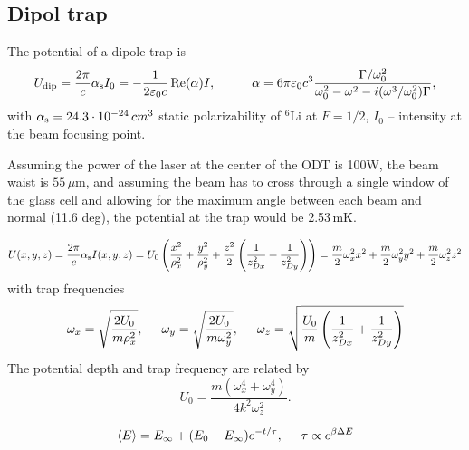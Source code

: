\subsection*{Dipol trap} 

The potential of a dipole trap is
\begin{equation}
	\sub{U}{dip} = \frac{2\pi}{c} \sub{\alpha}{s} I_0 = -\frac{1}{2 \varepsilon_0 c} \Re(\alpha) I,
	\hspace{10 mm} 
	\alpha = 6 \pi \varepsilon_0 c^3 \frac{\Gamma/\omega_0^2}{\omega_0^2 - \omega^2 - i (\omega^3 / \omega_0^2) \Gamma},
\end{equation}
with $\alpha_{\textnormal{s}} = 24.3 \cdot 10^{-24}\,cm^{3}$ static polarizability of $^{6}$Li at $F = 1/2$, $I_0$ -- intensity at the beam focusing point.


Assuming the power of the laser at the center of the ODT is 100W, the beam waist is $55\, \mu$m, and assuming the beam has to cross through a single window of the glass cell and allowing for the maximum angle between each beam and normal (11.6 deg), the potential at the trap would be 2.53\,mK.


\begin{equation*}
	U(x,y,z) = \frac{2\pi}{c} \alpha_{\textnormal{s}} I(x, y,z) = U_0 \left(
		\frac{x^2}{\rho_x^2} + \frac{y^2}{\rho_y^2} + \frac{z^2}{2} \left(\frac{1}{z_{Dx}^2} + \frac{1}{z_{Dy}^2}\right)
	\right) = \frac{m}{2}\omega_x^2 x^2 + \frac{m}{2} \omega_y^2 y^2 + \frac{m}{2} \omega_z^2 z^2
\end{equation*}
with trap frequencies
\begin{equation*}
	\omega_x = \sqrt{\frac{2U_0}{m \rho_x^2}},
	\hspace{5 mm} 
	\omega_y = \sqrt{\frac{2 U_0}{m \omega_y^2}},
	\hspace{5 mm} 
	\omega_z = \sqrt{\frac{U_0}{m}\left(
		\frac{1}{z_{Dx}^2} + \frac{1}{z_{Dy}^2}
	\right)}
\end{equation*}
The potential depth and trap frequency are related by 
\begin{equation*}
	U_0 = \frac{m(\omega_x^4 + \omega_y^4)}{4 k^2 \omega_z^2}.
\end{equation*}

\begin{equation*}
	\langle E\rangle = E_\infty + (E_0 - E_\infty) e^{-t/\tau}, 
	\hspace{5 mm} 
	\tau \propto e^{\beta \Delta E}
\end{equation*}

